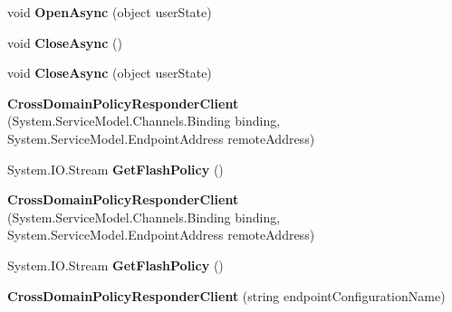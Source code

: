 \begin{DoxyCompactItemize}
\item 
\hypertarget{class_cross_domain_policy_responder_client_ae89e8766c64ccc9a78707686f65c4af5}{
void {\bfseries OpenAsync} (object userState)}
\label{class_cross_domain_policy_responder_client_ae89e8766c64ccc9a78707686f65c4af5}

\item 
\hypertarget{class_cross_domain_policy_responder_client_ab15a4cca0d395c15bd0f2c29b620a4db}{
void {\bfseries CloseAsync} ()}
\label{class_cross_domain_policy_responder_client_ab15a4cca0d395c15bd0f2c29b620a4db}

\item 
\hypertarget{class_cross_domain_policy_responder_client_a0198562d78b04ec1f5590dd27a3e4943}{
void {\bfseries CloseAsync} (object userState)}
\label{class_cross_domain_policy_responder_client_a0198562d78b04ec1f5590dd27a3e4943}

\item 
\hypertarget{class_cross_domain_policy_responder_client_a8597cad92f66c9a1621fbb1d77f488fa}{
{\bfseries CrossDomainPolicyResponderClient} (System.ServiceModel.Channels.Binding binding, System.ServiceModel.EndpointAddress remoteAddress)}
\label{class_cross_domain_policy_responder_client_a8597cad92f66c9a1621fbb1d77f488fa}

\item 
\hypertarget{class_cross_domain_policy_responder_client_a88e4d875b266124e2b43ef7520aa0f9b}{
System.IO.Stream {\bfseries GetFlashPolicy} ()}
\label{class_cross_domain_policy_responder_client_a88e4d875b266124e2b43ef7520aa0f9b}

\item 
\hypertarget{class_cross_domain_policy_responder_client_a8597cad92f66c9a1621fbb1d77f488fa}{
{\bfseries CrossDomainPolicyResponderClient} (System.ServiceModel.Channels.Binding binding, System.ServiceModel.EndpointAddress remoteAddress)}
\label{class_cross_domain_policy_responder_client_a8597cad92f66c9a1621fbb1d77f488fa}

\item 
\hypertarget{class_cross_domain_policy_responder_client_a88e4d875b266124e2b43ef7520aa0f9b}{
System.IO.Stream {\bfseries GetFlashPolicy} ()}
\label{class_cross_domain_policy_responder_client_a88e4d875b266124e2b43ef7520aa0f9b}

\item 
\hypertarget{class_cross_domain_policy_responder_client_a5bb8ef77ac406eea2c2ebfa219dc4c90}{
{\bfseries CrossDomainPolicyResponderClient} (string endpointConfigurationName)}
\label{class_cross_domain_policy_responder_client_a5bb8ef77ac406eea2c2ebfa219dc4c90}


\end{DoxyCompactItemize}
